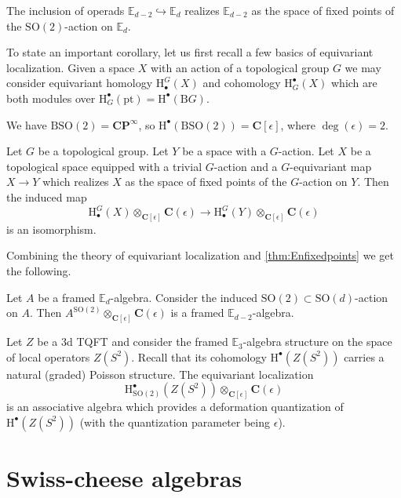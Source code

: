 \documentclass[10pt]{amsart}
\newcommand{\B}{\mathrm{B}}
\newcommand{\C}{\mathbf{C}}
\newcommand{\CP}{\mathbf{CP}}
\newcommand{\bE}{\mathbb{E}}
\newcommand{\rH}{\mathrm{H}}
\newcommand{\pt}{\mathrm{pt}}
\newcommand{\SO}{\mathrm{SO}}
\theoremstyle{definition}
\theoremstyle{definition}
\begin{document}
\begin{thm}
The inclusion of operads $\bE_{d-2}\hookrightarrow \bE_d$ realizes $\bE_{d-2}$ as the space of fixed points of the $\SO(2)$-action on $\bE_d$.
\label{thm:Enfixedpoints}
\end{thm}

To state an important corollary, let us first recall a few basics of equivariant localization. Given a space $X$ with an action of a topological group $G$ we may consider equivariant homology $\rH^G_\bullet(X)$ and cohomology $\rH^\bullet_G(X)$ which are both modules over $\rH^\bullet_G(\pt)=\rH^\bullet(\B G)$.

\begin{example}
We have $\B\SO(2)=\CP^\infty$, so $\rH^\bullet(\B\SO(2))=\C[\epsilon]$, where $\deg(\epsilon)=2$.
\end{example}

\begin{thm}
Let $G$ be a topological group. Let $Y$ be a space with a $G$-action. Let $X$ be a topological space equipped with a trivial $G$-action and a $G$-equivariant map $X\rightarrow Y$ which realizes $X$ as the space of fixed points of the $G$-action on $Y$. Then the induced map
\[\rH^G_\bullet(X)\otimes_{\C[\epsilon]} \C(\epsilon) \longrightarrow \rH^G_\bullet(Y)\otimes_{\C[\epsilon]} \C(\epsilon)\]
is an isomorphism.
\end{thm}

Combining the theory of equivariant localization and \cref{thm:Enfixedpoints} we get the following.

\begin{thm}
Let $A$ be a framed $\bE_d$-algebra. Consider the induced $\SO(2)\subset\SO(d)$-action on $A$. Then $A^{\SO(2)}\otimes_{\C[\epsilon]} \C(\epsilon)$ is a framed $\bE_{d-2}$-algebra.
\end{thm}

\begin{example}
Let $Z$ be a 3d TQFT and consider the framed $\bE_3$-algebra structure on the space of local operators $Z(S^2)$. Recall that its cohomology $\rH^\bullet(Z(S^2))$ carries a natural (graded) Poisson structure. The equivariant localization
\[\rH^\bullet_{\SO(2)}(Z(S^2))\otimes_{\C[\epsilon]} \C(\epsilon)\]
is an associative algebra which provides a deformation quantization of $\rH^\bullet(Z(S^2))$ (with the quantization parameter being $\epsilon$).
\end{example}

\section{Swiss-cheese algebras}
\end{document}
